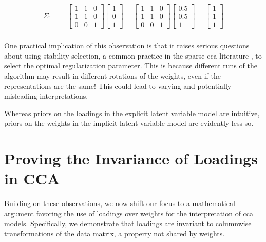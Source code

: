\begin{align}
    \Sigma_{1} &= \begin{bmatrix}
                         1 & 1 & 0 \\
                         1 & 1 & 0 \\
                         0 & 0 & 1
    \end{bmatrix}\begin{bmatrix}
                     1 \\
                     0 \\
                     1
    \end{bmatrix}=
    \begin{bmatrix}
        1 & 1 & 0 \\
        1 & 1 & 0 \\
        0 & 0 & 1
    \end{bmatrix}\begin{bmatrix}
                     0.5 \\
                     0.5 \\
                     1
    \end{bmatrix}= \begin{bmatrix}
                        1 \\
                        1 \\
                        1
    \end{bmatrix} \\
\end{align}

One practical implication of this observation is that it raises serious questions about using stability selection, a common practice in the sparse \acrshort{cca} literature \citep{mihalik2020multiple, deng2021sparse}, to select the optimal regularization parameter.
This is because different runs of the algorithm may result in different rotations of the weights, even if the representations are the same!
This could lead to varying and potentially misleading interpretations.

Whereas priors on the loadings in the explicit latent variable model are intuitive, priors on the weights in the implicit latent variable model are evidently less so.

\section{Proving the Invariance of Loadings in CCA}

Building on these observations, we now shift our focus to a mathematical argument favoring the use of \gls{loadings} over weights for the interpretation of \acrshort{cca} models.
Specifically, we demonstrate that \gls{loadings} are invariant to columnwise transformations of the data matrix, a property not shared by weights.

